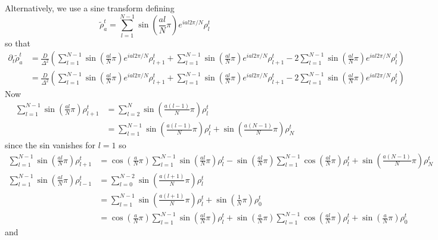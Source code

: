 \documentclass[aps,preprint]{revtex4-1}%
\begin{document}
Alternatively, we use a sine transform defining
\[
\widetilde{\rho}_{a}^{t}=\sum_{l=1}^{N-1}\sin\left(  \frac{al}{N}\pi\right)
e^{ial2\pi/N}\rho_{l}^{t}%
\]
so that
\begin{align*}
\partial_{t}\widetilde{\rho}_{a}^{t}  & =\frac{D}{\Delta^{2}}\left(
\sum_{l=1}^{N-1}\sin\left(  \frac{al}{N}\pi\right)  e^{ial2\pi/N}\rho
_{l+1}^{t}+\sum_{l=1}^{N-1}\sin\left(  \frac{al}{N}\pi\right)  e^{ial2\pi
/N}\rho_{l+1}^{t}-2\sum_{l=1}^{N-1}\sin\left(  \frac{al}{N}\pi\right)
e^{ial2\pi/N}\rho_{l}^{t}\right)  \\
& =\frac{D}{\Delta^{2}}\left(  \sum_{l=1}^{N-1}\sin\left(  \frac{al}{N}%
\pi\right)  e^{ial2\pi/N}\rho_{l+1}^{t}+\sum_{l=1}^{N-1}\sin\left(  \frac
{al}{N}\pi\right)  e^{ial2\pi/N}\rho_{l+1}^{t}-2\sum_{l=1}^{N-1}\sin\left(
\frac{al}{N}\pi\right)  e^{ial2\pi/N}\rho_{l}^{t}\right)
\end{align*}
Now%
\begin{align*}
\sum_{l=1}^{N-1}\sin\left(  \frac{al}{N}\pi\right)  \rho_{l+1}^{t}  &
=\sum_{l=2}^{N}\sin\left(  \frac{a\left(  l-1\right)  }{N}\pi\right)  \rho
_{l}^{t}\\
& =\sum_{l=1}^{N-1}\sin\left(  \frac{a\left(  l-1\right)  }{N}\pi\right)
\rho_{l}^{t}+\sin\left(  \frac{a\left(  N-1\right)  }{N}\pi\right)  \rho
_{N}^{t}%
\end{align*}
since the sin vanishes for $l=1$ so
\begin{align*}
\sum_{l=1}^{N-1}\sin\left(  \frac{al}{N}\pi\right)  \rho_{l+1}^{t}  &
=\cos\left(  \frac{a}{N}\pi\right)  \sum_{l=1}^{N-1}\sin\left(  \frac{al}%
{N}\pi\right)  \rho_{l}^{t}-\sin\left(  \frac{al}{N}\pi\right)  \sum
_{l=1}^{N-1}\cos\left(  \frac{al}{N}\pi\right)  \rho_{l}^{t}+\sin\left(
\frac{a\left(  N-1\right)  }{N}\pi\right)  \rho_{N}^{t}\\
\sum_{l=1}^{N-1}\sin\left(  \frac{al}{N}\pi\right)  \rho_{l-1}^{t}  &
=\sum_{l=0}^{N-2}\sin\left(  \frac{a\left(  l+1\right)  }{N}\pi\right)
\rho_{l}^{t}\\
& =\sum_{l=1}^{N-1}\sin\left(  \frac{a\left(  l+1\right)  }{N}\pi\right)
\rho_{l}^{t}+\sin\left(  \frac{1}{N}\pi\right)  \rho_{0}^{t}\\
& =\cos\left(  \frac{a}{N}\pi\right)  \sum_{l=1}^{N-1}\sin\left(  \frac{al}%
{N}\pi\right)  \rho_{l}^{t}+\sin\left(  \frac{a}{N}\pi\right)  \sum
_{l=1}^{N-1}\cos\left(  \frac{al}{N}\pi\right)  \rho_{l}^{t}+\sin\left(
\frac{a}{N}\pi\right)  \rho_{0}^{t}%
\end{align*}
and%
\end{document}
